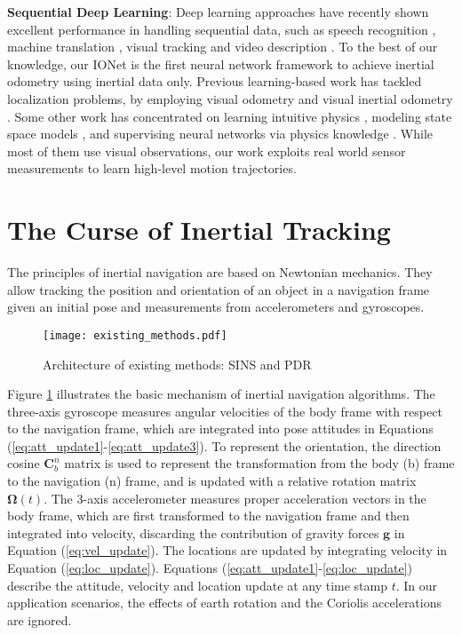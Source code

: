 \documentclass[letterpaper]{article}
\begin{document}
    \textbf{Sequential Deep Learning}: 
	Deep learning approaches have recently shown excellent performance in handling sequential data, such as speech recognition \cite{Graves2014}, machine translation \cite{Dai2015}, visual tracking \cite{Ondruska2016} and video description \cite{Donahue2015}. To the best of our knowledge, our IONet is the first neural network framework to achieve inertial odometry using inertial data only. Previous learning-based work has tackled localization problems, by employing visual odometry \cite{Zhou2017,Wang2017,Clark2017} and visual inertial odometry \cite{Clark2017a}. Some other work has concentrated on learning intuitive physics \cite{Hooman2017}, modeling state space models \cite{Karl2016}, and supervising neural networks via physics knowledge \cite{Stewart2017}. While most of them use visual observations, our work exploits real world sensor measurements to learn high-level motion trajectories.

\section{The Curse of Inertial Tracking}

The principles of inertial navigation are based on Newtonian mechanics. They allow tracking the position and orientation of an object in a navigation frame given an initial pose and measurements from accelerometers and gyroscopes.

	\begin{figure}
    	\centering
        \texttt{[image: existing\_methods.pdf]}
        \caption{\label{fig:existing_methods} Architecture of existing methods: SINS and PDR}
    \end{figure} 

Figure \ref{fig:existing_methods} illustrates the basic mechanism of inertial navigation algorithms. The three-axis gyroscope measures angular velocities of the body frame with respect to the navigation frame, which are integrated into pose attitudes in Equations (\ref{eq:att_update1}-\ref{eq:att_update3}). To represent the orientation, the direction cosine $\mathbf{C}_b^n$ matrix is used to represent the transformation from the body (b) frame to the navigation (n) frame, and is updated with a relative rotation matrix $\mathbf{\Omega}(t)$. The 3-axis accelerometer measures proper acceleration vectors in the body frame, which are first transformed to the navigation frame and then integrated into velocity, discarding the contribution of gravity forces $\mathbf{g}$ in Equation (\ref{eq:vel_update}). The locations are updated by integrating velocity in Equation (\ref{eq:loc_update}). Equations (\ref{eq:att_update1}-\ref{eq:loc_update}) describe the attitude, velocity and location update at any time stamp $t$. In our application scenarios, the effects of earth rotation and the Coriolis accelerations are ignored. 
\end{document}
